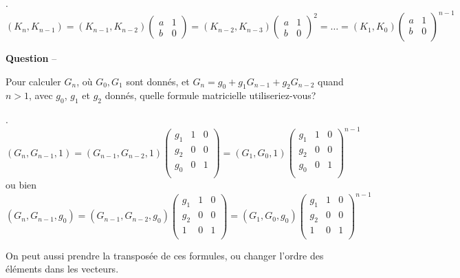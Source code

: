 \documentclass[12pt]{article}
\newcounter{QNumber}
\newcommand{\Question}[2][ ]{
 \stepcounter{QNumber}
  \noindent\textbf{Question \theQNumber} --
  #2~#1}
\begin{document}
.
$$(K_{n}, K_{n-1})= (K_{n-1}, K_{n-2}) \left(\begin{array}{cc} a & 1 \\
b & 0 \end{array}\right)= (K_{n-2}, K_{n-3}) \left(\begin{array}{cc} a & 1 \\
b & 0 \end{array}\right)^ 2 =\ldots = (K_1, K_0)  \left(\begin{array}{cc} a & 1 \\
b & 0 \\
\end{array}\right)^ {n-1}$$

\Question{
Pour calculer
$G_n$, o\`u $G_0, G_1$ sont donn\'es,
et $G_{n}= g_0 + g_1 G_{n-1} + g_2 G_{n-2}$ quand $n>1$, avec $g_0$, $g_1$ et $g_2$ donn\'es, quelle formule matricielle utiliseriez-vous?}

.
$$(G_n, G_{n-1}, 1)=( G_{n-1}, G_{n-2}, 1)
\left(\begin{array}{ccc} g_1 & 1 & 0 \\
g_2 & 0 & 0 \\
g_0 & 0 & 1 \\
\end{array}\right)=
( G_1, G_0, 1)
\left( \begin{array}{ccc} g_1 & 1 & 0 \\
g_2 & 0 & 0 \\
g_0 & 0 & 1 \\
\end{array}\right) ^ {n-1}$$
ou bien
$$(G_n, G_{n-1}, g_0)=( G_{n-1}, G_{n-2}, g_0)\left(\begin{array}{ccc} g_1 & 1 & 0 \\
g_2 & 0 & 0 \\
1 & 0 & 1 \\
\end{array}\right)=
( G_1, G_0, g_0 )\left(\begin{array}{ccc} g_1 & 1 & 0 \\
g_2 & 0 & 0 \\
1 & 0 & 1 \\
\end{array}\right)^ {n-1}$$

On peut aussi prendre la transposée de ces formules, ou changer l'ordre des éléments dans les vecteurs.

\end{document}
